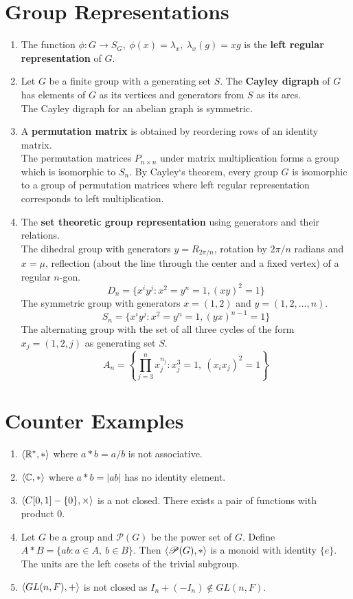 \section{Group Representations}
\begin{enumerate}
	\item The function $\phi : G \to S_G,\ \phi(x)=\lambda_x,\ \lambda_x(g) = xg$ is the \textbf{left regular representation} of $G$.
	\item Let $G$ be a finite group with a generating set $S$. The \textbf{Cayley digraph} of $G$ has elements of $G$ as its vertices and generators from $S$ as its arcs.\\
	The Cayley digraph for an abelian graph is symmetric.
	\item A \textbf{permutation matrix} is obtained by reordering rows of an identity matrix.\\
	The permutation matrices $P_{n \times n}$ under matrix multiplication forms a group which is isomorphic to $S_n$. By Cayley`s theorem, every group $G$ is isomorphic to a group of permutation matrices where left regular representation corresponds to left multiplication.
	\item The \textbf{set theoretic group representation} using generators and their relations.\\
	The dihedral group with generators $y=R_{2\pi/n}$, rotation by $2\pi/n$ radians and $x=\mu$, reflection (about the line through the center and a fixed vertex) of a regular $n$-gon.
	$$D_n = \{ x^iy^j : x^2=y^n=1, (xy)^2=1 \}$$
	The symmetric group with generators $x=(1,2)$ and $y=(1,2,\dots,n)$. 
	$$S_n = \{ x^iy^j : x^2=y^n=1,(yx)^{n-1}=1 \}$$
	The alternating group with the set of all three cycles of the form $x_j = (1,2,j)$ as generating set $S$.
	$$A_n = \left\{ \prod_{j=3}^n x_j^{n_j} : x_j^3=1,\ (x_ix_j)^2=1\right\}$$
\end{enumerate}

\section{Counter Examples}
\begin{enumerate}
	\item $\left\langle \mathbb{R}^\ast,\ast \right\rangle$ where $a \ast b = a/b$ is not associative.
	\item $\left\langle \mathbb{C},\ast \right\rangle$ where $a \ast b = |ab|$ has no identity element.
	\item $\left\langle C[0,1]-\{0\},\times \right\rangle$ is a not closed. There exists a pair of functions with product $0$.
	\item Let $G$ be a group and $\mathscr{P}(G)$ be the power set of $G$. Define $A \ast B = \{ ab : a \in A,\ b \in B \}$. Then $\left\langle \mathscr{P}(G),\ast \right\rangle$ is a monoid with identity $\{ e \}$. The units are the left cosets of the trivial subgroup.
	\item $\left\langle GL(n,F),+ \right\rangle$ is not closed as $I_n+(-I_n) \notin GL(n,F)$.
\end{enumerate}

